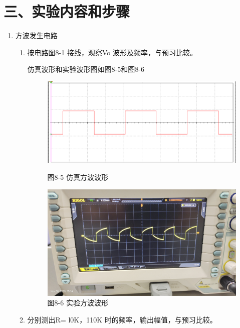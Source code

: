 \documentclass[a4paper,10pt,notitlepage]{article}
\begin{document}
	\section*{三、实验内容和步骤}
	\begin{enumerate}
		\item 方波发生电路
		\begin{enumerate}
			\item 按电路图8-1 接线，观察Vo 波形及频率，与预习比较。\par 
			仿真波形和实验波形图如图8-5和图8-6
			\begin{figure}
				\centering
				\begin{minipage}{0.3\textwidth}
					\centering
					\includegraphics[width=\textwidth]{预习报告/2.png}
					\caption*{图8-5 仿真方波波形}
				\end{minipage}
				\qquad
				\begin{minipage}{0.3\textwidth}
					\centering
					\includegraphics[width=\textwidth]{1.jpg}
					\caption*{图8-6 实验方波波形}
				\end{minipage}
			\end{figure}
			\item 分别测出R= l0K，110K 时的频率，输出幅值，与预习比较。\par 

\end{enumerate}
\end{enumerate}
\end{document}
